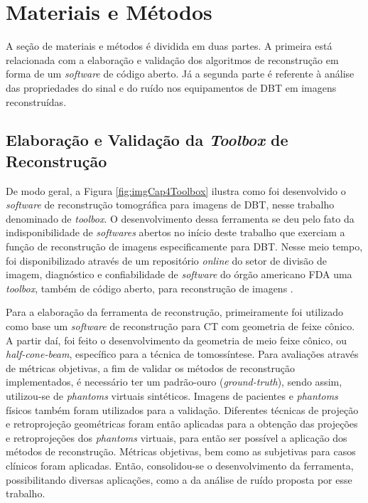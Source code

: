 \chapter[Materiais e Métodos]{Materiais e Métodos}\label{Capitulo5}
 

A seção de materiais e métodos é dividida em duas partes. A primeira está relacionada com a elaboração e validação dos algoritmos de reconstrução em forma de um \textit{software} de código aberto. Já a segunda parte é referente à análise das propriedades do sinal e do ruído nos equipamentos de \acs{DBT} em imagens reconstruídas. 

\section{Elaboração e Validação da \textit{Toolbox} de Reconstrução}

De modo geral, a Figura \ref{fig:imgCap4Toolbox} ilustra como foi desenvolvido o \textit{software} de reconstrução tomográfica para imagens de \acs{DBT}, nesse trabalho denominado de \textit{toolbox}. O desenvolvimento dessa ferramenta se deu pelo fato da indisponibilidade de \textit{softwares} abertos no início deste trabalho que exerciam a  função de reconstrução de imagens especificamente para \acs{DBT}. Nesse meio tempo, foi disponibilizado através de um repositório \textit{online} do setor de divisão de imagem, diagnóstico e confiabilidade de \textit{software} do órgão americano \acs{FDA} uma \textit{toolbox}, também de código aberto, para reconstrução de imagens \cite{Zengtoolbox}.  

Para a elaboração da ferramenta de reconstrução, primeiramente foi utilizado como base um \textit{software} de reconstrução para \acs{CT} com geometria de feixe cônico. A partir daí, foi feito o desenvolvimento da geometria de meio feixe cônico, ou \textit{half-cone-beam}, específico para a técnica de tomossíntese. Para avaliações através de métricas objetivas, a fim de  validar os métodos de reconstrução implementados, é necessário ter um padrão-ouro (\textit{ground-truth}), sendo assim, utilizou-se de \textit{phantoms} virtuais sintéticos. Imagens de pacientes e \textit{phantoms} físicos também foram utilizados para a validação. Diferentes técnicas de projeção e retroprojeção geométricas foram então aplicadas para a obtenção das projeções e retroprojeções dos \textit{phantoms} virtuais, para então ser possível a aplicação dos métodos de reconstrução. Métricas objetivas, bem como as subjetivas para casos clínicos foram aplicadas. Então, consolidou-se o desenvolvimento da ferramenta, possibilitando diversas aplicações, como a da análise de ruído proposta por esse trabalho.

